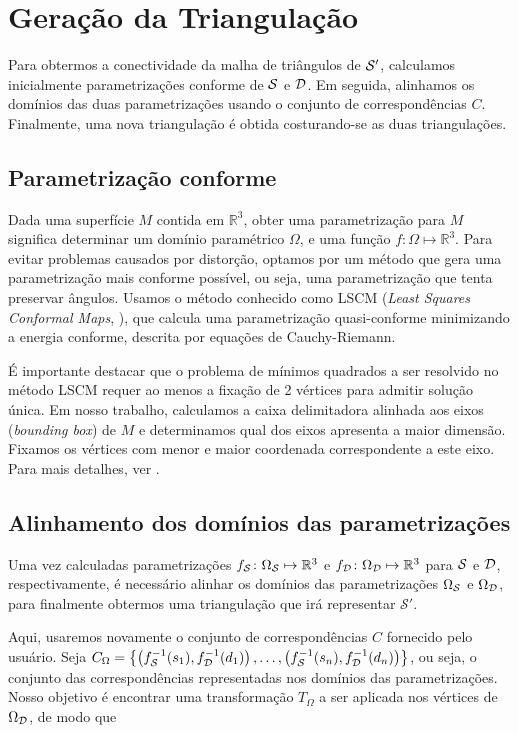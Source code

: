 \section{Geração da Triangulação}
Para obtermos a conectividade da malha de triângulos de $\mathcal{S}'$, calculamos inicialmente parametrizações conforme de $\mathcal{S}$ e $\mathcal{D}$. Em seguida, alinhamos os domínios das duas parametrizações usando o conjunto de correspondências $C$. Finalmente, uma nova triangulação é obtida costurando-se as duas triangulações.

\subsection{Parametrização conforme}
Dada uma superfície $M$ contida em $\mathbb{R}^3$, obter uma parametrização para $M$ significa determinar um domínio paramétrico $\Omega$, e uma função $f \colon \Omega \mapsto \mathbb{R}^3$. Para evitar problemas causados por distorção, optamos por um método que gera uma parametrização mais conforme possível, ou seja, uma parametrização que tenta preservar ângulos. Usamos o método conhecido como LSCM (\emph{Least Squares Conformal Maps}, \cite{Levy:2002}), que calcula uma parametrização quasi-conforme minimizando a energia conforme, descrita por equações de Cauchy-Riemann. 

É importante destacar que o problema de mínimos quadrados a ser resolvido no método LSCM requer ao menos a fixação de 2 vértices para admitir solução única. Em nosso trabalho, calculamos a caixa delimitadora alinhada aos eixos (\emph{bounding box}) de $M$ e determinamos qual dos eixos apresenta a maior dimensão. Fixamos os vértices com menor e maior coordenada correspondente a este eixo. Para mais detalhes, ver \cite{Levy:2002}. 

\subsection{Alinhamento dos domínios das parametrizações}
Uma vez calculadas parametrizações $f_{\mathcal{S}} \colon \Omega_{\mathcal{S}} \mapsto \mathbb{R}^3$ e $f_{\mathcal{D}} \colon \Omega_{\mathcal{D}} \mapsto \mathbb{R}^3$ para $\mathcal{S}$ e $\mathcal{D}$, respectivamente, é necessário alinhar os domínios das parametrizações $\Omega_{\mathcal{S}}$ e $\Omega_{\mathcal{D}}$, para finalmente obtermos uma triangulação que irá representar $\mathcal{S}'$. 

Aqui, usaremos novamente o conjunto de correspondências $C$ fornecido pelo usuário. Seja $C_{\Omega} = \left\{ \left(f_{\mathcal{S}}^{-1}(s_1),f_{\mathcal{D}}^{-1}(d_1)\right),\dots,\left(f_{\mathcal{S}}^{-1}(s_n),f_{\mathcal{D}}^{-1}(d_n)\right)\right\}$, ou seja, o conjunto das correspondências representadas nos domínios das parametrizações. Nosso objetivo é encontrar uma transformação $T_\Omega$ a ser aplicada nos vértices de $\Omega_{\mathcal{D}}$, de modo que 

